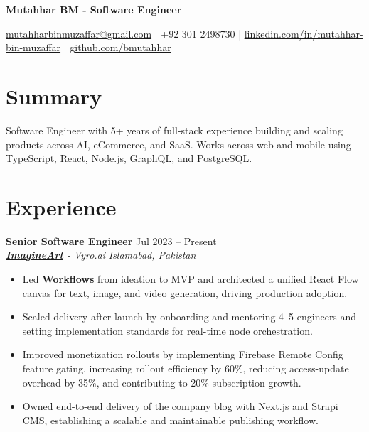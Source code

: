 \documentclass[9pt,letterpaper]{article}
\newcommand{\resumeHeader}[1]{%
  \begin{center}
    \vspace{2pt}
    {\fontsize{18pt}{20pt}\selectfont\bfseries #1\par}
    \vspace{4pt}
  \end{center}
}
\newcommand{\role}[4]{\textbf{#1} \hfill #2 \\
\textit{#3} \hfill \textit{#4}\\[-4pt]}
\begin{document}
\resumeHeader{Mutahhar BM - Software Engineer}
\begin{center}
\fontsize{9pt}{11pt}\selectfont
\href{mailto:mutahharbinmuzaffar@gmail.com}{mutahharbinmuzaffar@gmail.com} \;|\; +92 301 2498730 \;|\;
\href{https://www.linkedin.com/in/mutahhar-bin-muzaffar}{linkedin.com/in/mutahhar-bin-muzaffar} \;|\;
\href{https://github.com/bmutahhar}{github.com/bmutahhar}
\end{center}

\section*{Summary}
Software Engineer with 5+ years of full-stack experience building and scaling products across AI, eCommerce, and SaaS. Works across web and mobile using TypeScript, React, Node.js, GraphQL, and PostgreSQL.

\section*{Experience}
\role{Senior Software Engineer}{Jul 2023 -- Present}{\href{https://www.imagine.art/}{\textbf{\underline{ImagineArt}}} - Vyro.ai}{Islamabad, Pakistan}
\begin{itemize}[leftmargin=*, itemsep=0pt, topsep=0pt, partopsep=0pt, parsep=0pt, after=\vspace{2pt}]
  \item Led \href{https://www.imagine.art/flow}{\textbf{\underline{Workflows}}} from ideation to MVP and architected a unified React Flow canvas for text, image, and video generation, driving production adoption.
  \item Scaled delivery after launch by onboarding and mentoring 4--5 engineers and setting implementation standards for real-time node orchestration.
  \item Improved monetization rollouts by implementing Firebase Remote Config feature gating, increasing rollout efficiency by 60\%, reducing access-update overhead by 35\%, and contributing to 20\% subscription growth.
  \item Owned end-to-end delivery of the company blog with Next.js and Strapi CMS, establishing a scalable and maintainable publishing workflow.

\end{itemize}
\end{document}
